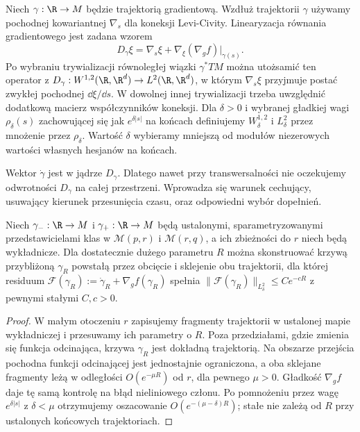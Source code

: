\begin{definicja}
Niech $\gamma:\R\to M$ będzie trajektorią gradientową.
Wzdłuż trajektorii $\gamma$ używamy pochodnej
kowariantnej $\nabla_s$ dla koneksji Levi-Civity.
Linearyzacja równania gradientowego jest zadana wzorem
\[
 D_\gamma\xi=\nabla_s\xi+
 \nabla_\xi(\nabla_g f)\big|_{\gamma(s)}.
\]
Po wybraniu trywializacji równoległej wiązki
$\gamma^*TM$ można utożsamić ten operator z
$D_\gamma:W^{1,2}(\R,\R^d)\to L^2(\R,\R^d)$,
w którym $\nabla_s\xi$ przyjmuje postać
zwykłej pochodnej $\dd\xi/\dd s$.
W dowolnej innej trywializacji trzeba uwzględnić
dodatkową macierz współczynników koneksji.
Dla $\delta>0$ i wybranej gładkiej wagi
$\rho_\delta(s)$ zachowującej się jak
$e^{\delta|s|}$ na końcach definiujemy
$W^{1,2}_\delta$ i $L^2_\delta$ przez mnożenie przez
$\rho_\delta$. Wartość $\delta$ wybieramy mniejszą od
modułów niezerowych wartości własnych hesjanów na końcach.
\end{definicja}
\begin{uwaga}
Wektor $\dot\gamma$ jest w jądrze $D_\gamma$.
Dlatego nawet przy transwersalności nie oczekujemy
odwrotności $D_\gamma$ na całej przestrzeni.
Wprowadza się warunek cechujący, usuwający kierunek
przesunięcia czasu, oraz odpowiedni wybór dopełnień.
\end{uwaga}
\begin{lemat}
\label{lem:xviii-preglue}
Niech $\gamma_-:\R\to M$ i $\gamma_+:\R\to M$
będą ustalonymi, sparametryzowanymi przedstawicielami
klas w $\mathcal M(p,r)$ i $\mathcal M(r,q)$,
a ich zbieżności do $r$ niech będą wykładnicze. Dla dostatecznie dużego parametru
$R$ można skonstruować krzywą przybliżoną $\gamma_R$
powstałą przez obcięcie i sklejenie obu trajektorii,
dla której residuum
$\mathcal F(\gamma_R):=\dot\gamma_R+\nabla_g f(\gamma_R)$
spełnia $\|\mathcal F(\gamma_R)\|_{L^2_\delta}
\le C e^{-cR}$ z pewnymi stałymi $C,c>0$.
\end{lemat}
\begin{proof}
W małym otoczeniu $r$ zapisujemy fragmenty trajektorii
w ustalonej mapie wykładniczej i przesuwamy ich parametry
o $R$. Poza przedziałami, gdzie zmienia się funkcja
odcinająca, krzywa $\gamma_R$ jest dokładną trajektorią.
Na obszarze przejścia pochodna funkcji odcinającej jest
jednostajnie ograniczona, a oba sklejane fragmenty
leżą w odległości $O(e^{-\mu R})$ od $r$, dla pewnego
$\mu>0$. Gładkość $\nabla_g f$ daje tę samą kontrolę
na błąd nieliniowego członu. Po pomnożeniu przez
wagę $e^{\delta|s|}$ z $\delta<\mu$ otrzymujemy
oszacowanie $O(e^{-(\mu-\delta)R})$; stałe nie zależą
od $R$ przy ustalonych końcowych trajektoriach.
\end{proof}
